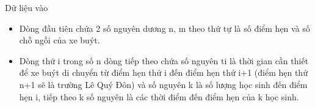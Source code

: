 Dữ liệu vào  
\begin{itemize}
	\item     Dòng đầu tiên chứa 2 số nguyên dương n, m theo thứ tự là số điểm hẹn và số chỗ ngồi của xe buýt.   
	\item     Dòng thứ i trong số n dòng tiếp theo chứa số nguyên ti là thời gian cần thiết để xe buýt di chuyển từ điểm hẹn thứ i đến điểm hẹn thứ i+1 (điểm hẹn thứ n+1 sẽ là trường Lê Quý Đôn) và số nguyên k là số   lượng học sinh đến điểm hẹn i, tiếp theo k số nguyên là các thời điểm đến điểm hẹn của k học sinh.   
\end{itemize}